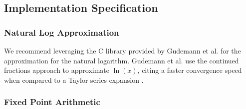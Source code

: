 \subsection{Implementation Specification}

\subsubsection{Natural Log Approximation}
We recommend leveraging the C library provided by Gudemann et al. \cite{GC19} for the approximation for the natural logarithm. Gudemann et al. use the continued fractions approach to approximate $\ln(x)$, citing a faster convergence speed when compared to a Taylor series expansion \cite{Gud19}. 

\subsubsection{Fixed Point Arithmetic}

